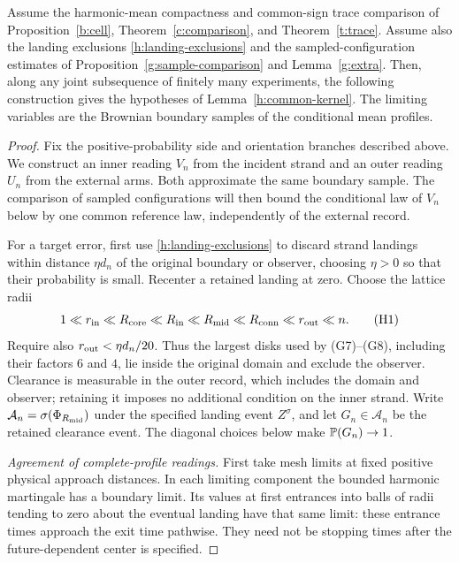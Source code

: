 \begin{proposition}
\label{h:readings}
Assume the harmonic-mean compactness and common-sign trace comparison of
Proposition~\ref{b:cell}, Theorem~\ref{c:comparison}, and
Theorem~\ref{t:trace}. Assume also the landing exclusions
\eqref{h:landing-exclusions} and the sampled-configuration estimates
of Proposition~\ref{g:sample-comparison} and Lemma~\ref{g:extra}.
Then, along any joint subsequence of finitely many experiments, the
following construction gives the hypotheses of
Lemma~\ref{h:common-kernel}.
The limiting variables are the Brownian boundary samples of the
conditional mean profiles.
\end{proposition}
\begin{proof}
Fix the positive-probability side and orientation branches described
above. We construct an inner reading $V_n$ from the incident strand
and an outer reading $U_n$ from the external arms. Both approximate
the same boundary sample. The comparison of sampled configurations
will then bound the conditional law of $V_n$ below by one common
reference law, independently of the external record.

For a target error, first use \eqref{h:landing-exclusions} to discard
strand landings within distance $\eta d_n$ of the original boundary
or observer, choosing $\eta>0$ so that their probability is small.
Recenter a retained landing at zero. Choose the lattice radii
\[
 1\ll r_{\rm in}\ll R_{\rm core}\ll R_{\rm in}\ll R_{\rm mid}
       \ll R_{\rm conn}\ll r_{\rm out}\ll n.                 \tag{H1}
\]
Require also $r_{\rm out}<\eta d_n/20$. Thus the largest disks used by
(G7)--(G8), including their factors $6$ and $4$, lie inside the original
domain and exclude the observer. Clearance is measurable in the outer
record, which includes the domain and observer; retaining it imposes no
additional condition on the inner strand. Write
$\mathcal A_n=\sigma(\Phi_{R_{\rm mid}})$ under the specified landing
event $Z^\sigma$, and let $G_n\in\mathcal A_n$ be the retained
clearance event. The diagonal choices below make $\mathbb P(G_n)\to1$.

\emph{Agreement of complete-profile readings.}
First take mesh limits at fixed positive physical approach distances.
In each limiting component the bounded harmonic martingale has a
boundary limit. Its values at first entrances into balls of radii
tending to zero about the eventual landing have that same limit:
these entrance times approach the exit time pathwise. They need not
be stopping times after the future-dependent center is specified.


\end{proof}
